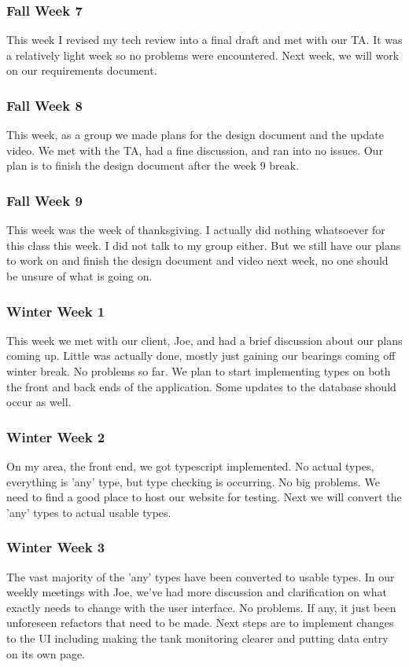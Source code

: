     \subsubsection{Fall Week 7}
        \noindent
        This week I revised my tech review into a final draft and met with our TA.
        It was a relatively light week so no problems were encountered.
        Next week, we will work on our requirements document.
    \subsubsection{Fall Week 8}
        \noindent
        This week, as a group we made plans for the design document and the update video.
        We met with the TA, had a fine discussion, and ran into no issues.
        Our plan is to finish the design document after the week 9 break.
    \subsubsection{Fall Week 9}
        \noindent
        This week was the week of thanksgiving. I actually did nothing whatsoever for this class this week. I did not talk to my group either. But we still have our plans to work on and finish the design document and video next week, no one should be unsure of what is going on.
    \subsubsection{Winter Week 1}
        \noindent
        This week we met with our client, Joe, and had a brief discussion about our plans coming up. Little was actually done, mostly just gaining our bearings coming off winter break.
        No problems so far.
        We plan to start implementing types on both the front and back ends of the application. Some updates to the database should occur as well.
    \subsubsection{Winter Week 2}
        \noindent
        On my area, the front end, we got typescript implemented. No actual types, everything is 'any' type, but type checking is occurring.
        No big problems. We need to find a good place to host our website for testing.
        Next we will convert the 'any' types to actual usable types.
    \subsubsection{Winter Week 3}
        \noindent
        The vast majority of the 'any' types have been converted to usable types. In our weekly meetings with Joe, we've had more discussion and clarification on what exactly needs to change with the user interface.
        No problems. If any, it just been unforeseen refactors that need to be made.
        Next steps are to implement changes to the UI including making the tank monitoring clearer and putting data entry on its own page.
